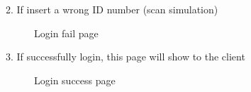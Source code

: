 \documentclass[12pt]{report}
\begin{document}
2.	If insert a wrong ID number (scan simulation)
\begin{figure}[H]
	\caption{\label{fig:6_loginFail}Login fail page}	
\end{figure}

3.	If successfully login, this page will show to the client
\begin{figure}[H]
	\caption{\label{fig:6_successfully_login}Login success page}	
\end{figure}
\end{document}
